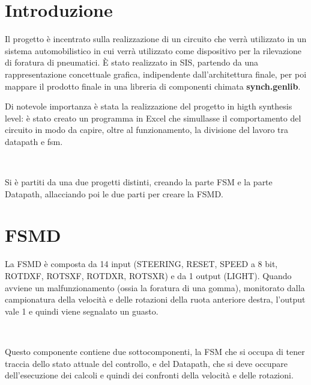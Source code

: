 \documentclass[a4paper,titlepage]{book}
\begin{document}
\begin{frontespizio}


\end{frontespizio}

\tableofcontents



\chapter{Introduzione}

Il progetto è incentrato sulla realizzazione di un circuito che verrà utilizzato in un sistema automobilistico in cui verrà utilizzato come dispositivo per la rilevazione di foratura di pneumatici. È stato realizzato in SIS, partendo da una rappresentazione concettuale grafica, indipendente dall'architettura finale, per poi mappare il prodotto finale in una libreria di componenti chimata \textbf{synch.genlib}.

Di notevole importanza è stata la realizzazione del progetto in higth synthesis level: è stato creato un programma in Excel che simullasse il comportamento del circuito in modo da capire, oltre al funzionamento, la divisione del lavoro tra datapath e fsm.

~

Si è partiti da una due progetti distinti, creando la parte FSM e la parte Datapath, allacciando poi le due parti per creare la FSMD.


\chapter{FSMD}

La FSMD è composta da 14 input (STEERING, RESET, SPEED a 8 bit, ROTDXF, ROTSXF, ROTDXR, ROTSXR) e da 1 output (LIGHT). Quando avviene un malfunzionamento (ossia la foratura di una gomma), monitorato dalla campionatura della velocità e delle rotazioni della ruota anteriore destra, l'output vale 1 e quindi viene segnalato un guasto.

~

Questo componente contiene due sottocomponenti, la FSM che si occupa di tener traccia dello stato attuale del controllo, e del Datapath, che si deve occupare dell'esecuzione dei calcoli e quindi dei confronti della velocità e delle rotazioni.
\end{document}
